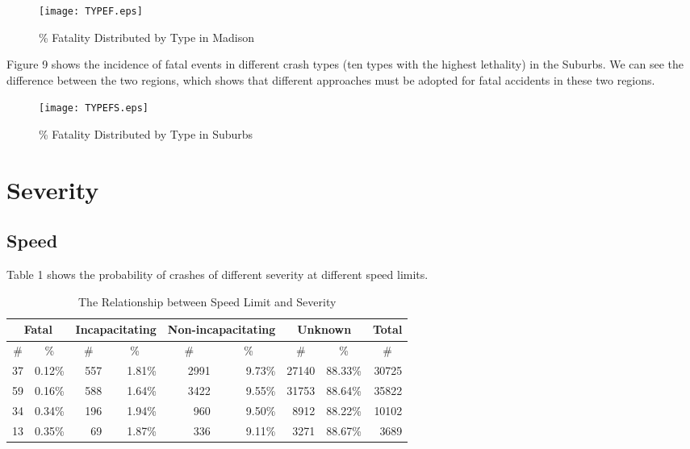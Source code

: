 \documentclass[10pt]{article}
\begin{document}
\begin{figure}[H]
\flushleft
\texttt{[image: TYPEF.eps]}
\caption{\% Fatality Distributed by Type in Madison}
\label{16}
\end{figure}

\newpage
Figure 9 shows the incidence of fatal events in different crash types (ten types with the highest lethality) in the Suburbs. We can see the difference between the two regions, which shows that different approaches must be adopted for fatal accidents in these two regions.

\begin{figure}[H]
\flushleft
\texttt{[image: TYPEFS.eps]}
\caption{\% Fatality Distributed by Type in Suburbs}
\label{17}
\end{figure}

\newpage
\section{Severity}
\subsection{Speed}
Table 1 shows the probability of crashes of different severity at different speed limits.

\begin{table}[H]
  \centering
  \caption{The Relationship between Speed Limit and Severity}
    \begin{tabular}{rrrrrrrrr}
    \multicolumn{2}{c}{Fatal} & \multicolumn{2}{c}{Incapacitating} & \multicolumn{2}{c}{Non-incapacitating} & \multicolumn{2}{c}{Unknown} & \multicolumn{1}{l}{Total} \\
    \hline
    \multicolumn{1}{c}{\#} & \multicolumn{1}{c}{\%} & \multicolumn{1}{c}{\#} & \multicolumn{1}{c}{\%} & \multicolumn{1}{c}{\#} & \multicolumn{1}{c}{\%} & \multicolumn{1}{c}{\#} & \multicolumn{1}{c}{\%} & \multicolumn{1}{c}{\#} \\
    \hline
    37    & 0.12\% & 557   & 1.81\% & 2991  & 9.73\% & 27140 & 88.33\% & 30725 \\
    59    & 0.16\% & 588   & 1.64\% & 3422  & 9.55\% & 31753 & 88.64\% & 35822 \\
    34    & 0.34\% & 196   & 1.94\% & 960   & 9.50\% & 8912  & 88.22\% & 10102 \\
    13    & 0.35\% & 69    & 1.87\% & 336   & 9.11\% & 3271  & 88.67\% & 3689 \\
    \hline
    \end{tabular}%
  \label{tab:addlabel}%
\end{table}%
\end{document}
